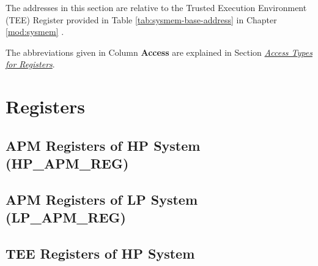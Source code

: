 \documentclass[main\_\_EN.tex]{subfiles}
\begin{document}
The addresses in this section are relative to the Trusted Execution Environment (TEE) Register provided in Table \ref{tab:sysmem-base-address} in Chapter \ref{mod:sysmem} \textit{}.

The abbreviations given in Column \textbf{Access} are explained in Section \hyperref[glossary-access-types]{\textit{Access Types for Registers}}.





\clearpage
\section{Registers}


\subsection{APM Registers of HP System (HP\_APM\_REG)}


\subsection{APM Registers  of LP System (LP\_APM\_REG)}


\subsection{TEE Registers of HP System}

\end{document}
